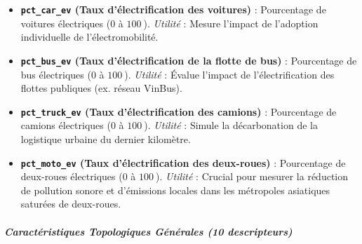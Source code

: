\documentclass[10pt, a4paper]{article}
\providecommand{\tightlist}{}
\begin{document}
\begin{itemize}
\tightlist
\item
  \textbf{\texttt{pct\_car\_ev} (Taux d'électrification des voitures)} :
  Pourcentage de voitures électriques (\(0\) à \(100\ %
  \)). \emph{Utilité} : Mesure l'impact de l'adoption individuelle de
  l'électromobilité.
\item
  \textbf{\texttt{pct\_bus\_ev} (Taux d'électrification de la flotte de
  bus)} : Pourcentage de bus électriques (\(0\) à \(100\ %
  \)). \emph{Utilité} : Évalue l'impact de l'électrification des flottes
  publiques (ex. réseau VinBus).
\item
  \textbf{\texttt{pct\_truck\_ev} (Taux d'électrification des camions)}
  : Pourcentage de camions électriques (\(0\) à \(100\ %
  \)). \emph{Utilité} : Simule la décarbonation de la logistique urbaine
  du dernier kilomètre.
\item
  \textbf{\texttt{pct\_moto\_ev} (Taux d'électrification des
  deux-roues)} : Pourcentage de deux-roues électriques (\(0\) à \(100\ %
  \)). \emph{Utilité} : Crucial pour mesurer la réduction de pollution
  sonore et d'émissions locales dans les métropoles asiatiques saturées
  de deux-roues.
\end{itemize}

\subparagraph{Caractéristiques Topologiques Générales (10
descripteurs)}\label{caractuxe9ristiques-topologiques-guxe9nuxe9rales-10-descripteurs-1}
\end{document}
